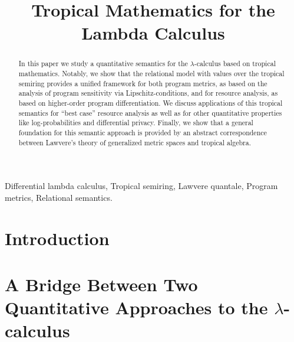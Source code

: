 \documentclass[conference]{IEEEtran}
\begin{document}
\title{Tropical Mathematics for the Lambda Calculus}


\maketitle

\begin{abstract}
In this paper we study a quantitative semantics for the $\lambda$-calculus based on tropical mathematics. Notably, we show that the relational model with values over the tropical semiring 
provides a unified framework for both 
program metrics, as based on the analysis of program sensitivity via Lipschitz-conditions, and for resource analysis, as based on higher-order program differentiation.
We discuss applications of this tropical semantics for ``best case'' resource analysis as well as for other quantitative properties like log-probabilities and differential privacy.
Finally, we show that a general foundation for this semantic approach is provided by an abstract correspondence between Lawvere's theory  
of generalized metric spaces and tropical algebra.



\end{abstract}

\begin{IEEEkeywords}
Differential lambda calculus, Tropical semiring, Lawvere quantale, Program metrics, Relational semantics.
\end{IEEEkeywords}

\section{Introduction}



\section{A Bridge Between Two Quantitative Approaches to the $\lambda$-calculus}\label{section2}

\end{document}
